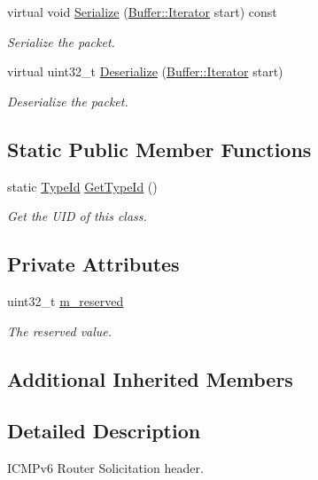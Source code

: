 \begin{DoxyCompactItemize}
virtual void \hyperlink{classns3_1_1Icmpv6RS_aa2e8d1a63701015e774a9a5d660dfde4}{Serialize} (\hyperlink{classns3_1_1Buffer_1_1Iterator}{Buffer\+::\+Iterator} start) const 
\begin{DoxyCompactList}\small\item\em Serialize the packet. \end{DoxyCompactList}\item 
virtual uint32\+\_\+t \hyperlink{classns3_1_1Icmpv6RS_a9b7bf06890d0aa82bc87bf70cf6181dd}{Deserialize} (\hyperlink{classns3_1_1Buffer_1_1Iterator}{Buffer\+::\+Iterator} start)
\begin{DoxyCompactList}\small\item\em Deserialize the packet. \end{DoxyCompactList}\end{DoxyCompactItemize}
\subsection*{Static Public Member Functions}
\begin{DoxyCompactItemize}
\item 
static \hyperlink{classns3_1_1TypeId}{Type\+Id} \hyperlink{classns3_1_1Icmpv6RS_a8655c8dca88a2beebf356c6f98b6a6a3}{Get\+Type\+Id} ()
\begin{DoxyCompactList}\small\item\em Get the U\+ID of this class. \end{DoxyCompactList}\end{DoxyCompactItemize}
\subsection*{Private Attributes}
\begin{DoxyCompactItemize}
\item 
uint32\+\_\+t \hyperlink{classns3_1_1Icmpv6RS_a860127991ad207f66247e907a2164e73}{m\+\_\+reserved}
\begin{DoxyCompactList}\small\item\em The reserved value. \end{DoxyCompactList}\end{DoxyCompactItemize}
\subsection*{Additional Inherited Members}


\subsection{Detailed Description}
I\+C\+M\+Pv6 Router Solicitation header. 

